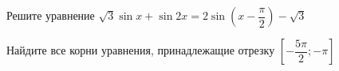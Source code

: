 \begin{ex}
	\begin{condition}
		\begin{enumcols}[label=\asbuk*)]
			\item Решите уравнение \( \sqrt{3}\sin x + \sin 2x = 2\sin {\left(x - \dfrac{\pi}{2}\right)} - \sqrt{3} \)
			\item Найдите все корни уравнения, принадлежащие отрезку \( \left[-\dfrac{5\pi}{2};-\pi\right] \)
		\end{enumcols}
	\end{condition}
\end{ex}